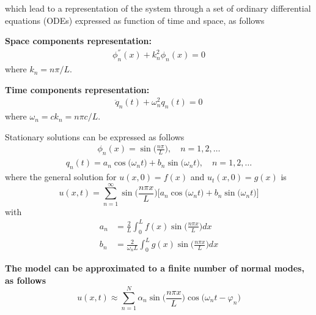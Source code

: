 \documentclass[12pt,a4paper]{scrartcl}
\begin{document}
\begin{onehalfspace}
which lead to a representation of the system through a set of ordinary differential equations (ODEs) expressed as function of time and space, as follows
\begin{mybox}
\noindent\textbf{Space components representation:}
\begin{equation}
	\begin{aligned}
		\phi_n^{''}(x) + k_n^2 \phi_n(x) = 0
	\end{aligned}
\end{equation}
where $k_n = {n\pi}/{L}$.
\end{mybox}

\begin{mybox}
\noindent\textbf{Time components representation:}
\begin{equation}
	\begin{aligned}
		\ddot{q}_n(t) + \omega_n^2 q_n(t) = 0
	\end{aligned}
\end{equation}
where $\omega_n = ck_n = {n\pi c}/{L}$.	
\end{mybox}

Stationary solutions can be expressed as follows
\begin{equation}
	\begin{aligned}
		\phi_n(x) = \sin\Big(\frac{n\pi}{L}\Big),\quad n=1,2,\dots
	\end{aligned}
\end{equation}
\begin{equation}
	\begin{aligned}
		q_n(t) = a_n\cos\big(\omega_nt\big) + b_n\sin\big(\omega_nt\big),\quad n=1,2,\dots
	\end{aligned}
\end{equation}
where the general solution for $u(x,0) = f(x)$ and $u_t(x,0) = g(x)$ is
\begin{equation}
	u(x,t) = \sum_{n=1}^{\infty} \sin\Big(\frac{n\pi x}{L}\Big) \Big[a_n\cos\big(\omega_nt\big) + b_n\sin\big(\omega_nt\big)\Big]
\end{equation}
with 
\begin{equation}
	\begin{aligned}
		a_n &= \frac{2}{L}\int_{0}^{L}f(x)\sin\Big(\frac{n\pi x}{L}\Big) dx \\[6pt]
		b_n &= \frac{2}{\omega_n L}\int_{0}^{L}g(x)\sin\Big(\frac{n\pi x}{L}\Big) dx
	\end{aligned}
\end{equation}

\begin{mybox}
\textbf{The model can be approximated to a finite number of normal modes, as follows}
\begin{equation}
	u(x,t) \approx \sum_{n=1}^{N} \alpha_n\sin\Big(\frac{n\pi x}{L}\Big) \cos\big(\omega_n t - \varphi_n\big)
\end{equation}
\end{mybox}


\end{onehalfspace}
\end{document}
